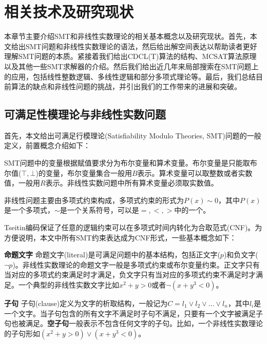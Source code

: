 \chapter{相关技术及研究现状}\label{chap:Relate}

本章节主要介绍SMT和非线性实数理论的相关基本概念以及研究现状。首先，本文给出SMT问题和非线性实数理论的语法，然后给出解空间表达以帮助读者更好理解SMT问题的本质。紧接着我们给出CDCL(T)算法的结构、MCSAT算法原理以及其他一些SMT求解器的介绍。然后我们给出近几年来局部搜索在SMT问题上的应用，包括线性整数逻辑、多线性逻辑和部分多项式理论等。最后，我们总结目前算法的缺点和非线性问题的挑战，并引出我们的工作带来的进展和突破。

\section{可满足性模理论与非线性实数问题}
首先，本文给出可满足行模理论(Satisfiability Modulo Theories, SMT)问题的一般定义，前置概念介绍如下：

\begin{definition}[\textbf{变量}]
SMT问题中的变量根据赋值要求分为布尔变量和算术变量。布尔变量是只能取布尔值($\top, \bot$)的变量，布尔变量集合一般用$B$表示。算术变量可以取整数或者实数值，一般用$R$表示。非线性实数问题中所有算术变量必须取实数值。
\end{definition}

\begin{definition}
非线性问题主要由多项式约束构成，多项式约束的形式为$P(x) \sim 0$，其中$P(x)$是一个多项式，$\sim$是一个关系符号，可以是$=, <, >$中的一个。
\end{definition}


Tseitin编码保证了任意的逻辑约束可以在多项式时间内转化为合取范式(CNF)。为方便说明，本文中所有SMT约束表达成为CNF形式，一些基本概念如下：
\begin{definition}{\textbf{命题文字}}
命题文字(literal)是可满足问题中的基本结构，包括正文字($p$)和负文字($\neg p$)。非线性实数理论的命题文字一般是多项式约束或布尔变量约束。正文字只有当对应的多项式约束满足时才满足，负文字只有当对应的多项式约束不满足时才满足。一个典型的非线性实数文字比如$x^2 + y > 0$或者$\neg (x + y^3 < 0)$。
\end{definition}

\begin{definition}{\textbf{子句}}
子句(clause)定义为文字的析取结构，一般记为$C = l_1 \vee l_2 \vee \dots \vee l_n$，其中$l_i$是一个文字。当子句包含的所有文字不满足时子句不满足，只要有一个文字被满足子句也被满足。\textbf{空子句}一般表示不包含任何文字的子句。比如，一个非线性实数理论的子句形如$(x^2 + y > 0) \vee (x + y^3 < 0)$。
\end{definition}

